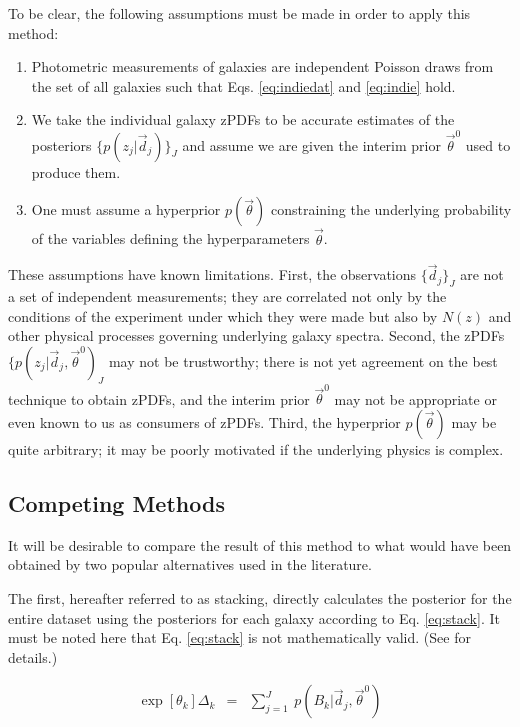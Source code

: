 \documentclass[preprint]{aastex}
\begin{document}
To be clear, the following assumptions must be made in order to apply this 
method:

\begin{enumerate}
\item Photometric measurements of galaxies are independent Poisson draws from 
the set of all galaxies such that Eqs. \ref{eq:indiedat} and \ref{eq:indie} 
hold.
\item We take the individual galaxy zPDFs to be accurate estimates of the 
posteriors $\{p(z_{j}|\vec{d}_{j})\}_{J}$ and assume we are given the interim 
prior $\vec{\theta}^{0}$ used to produce them.
\item One must assume a hyperprior $p(\vec{\theta})$ constraining the 
underlying probability of the variables defining the hyperparameters 
$\vec{\theta}$.
\end{enumerate}

These assumptions have known limitations.  First, the observations 
$\{\vec{d}_{j}\}_{J}$ are not a set of independent measurements; they are 
correlated not only by the conditions of the experiment under which they were 
made but also by $N(z)$ and other physical processes governing underlying 
galaxy spectra.  Second, the zPDFs 
$\{p(z_{j}|\vec{d}_{j},\vec{\theta}^{0})_{J}$ may not be trustworthy; there is 
not yet agreement on the best technique to obtain zPDFs, and the interim prior 
$\vec{\theta}^{0}$ may not be appropriate or even known to us as consumers of 
zPDFs.  Third, the hyperprior $p(\vec{\theta})$ may be quite arbitrary; it may 
be poorly motivated if the underlying physics is complex.

\clearpage
\subsection{Competing Methods}
\label{sec:sheldon}

It will be desirable to compare the result of this method to what would have 
been obtained by two popular alternatives used in the literature.   

The first, hereafter referred to as stacking, directly calculates the posterior 
for the entire dataset using the posteriors for each galaxy according to Eq. 
\ref{eq:stack}.  \citep{lim08}  It must be noted here that Eq. \ref{eq:stack} 
is not mathematically valid.  (See \citet{hog12} for details.)  

\begin{eqnarray}
\label{eq:stack}
\exp[\theta_{k}]\Delta_{k} &=& \sum_{j=1}^{J}\ 
p(B_{k}|\vec{d}_{j},\vec{\theta}^{0})
\end{eqnarray}
\end{document}

